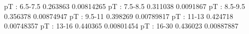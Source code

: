 pT : 6.5-7.5
0.263863 0.00814265
pT : 7.5-8.5
0.311038 0.0091867
pT : 8.5-9.5
0.356378 0.00874947
pT : 9.5-11
0.398269 0.00789817
pT : 11-13
0.424718 0.00748357
pT : 13-16
0.440365 0.00801454
pT : 16-30
0.436023 0.00887887
